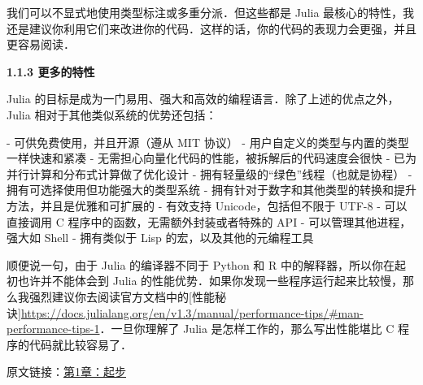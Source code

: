 我们可以不显式地使用类型标注或多重分派．但这些都是 Julia 最核心的特性，我还是建议你利用它们来改进你的代码．这样的话，你的代码的表现力会更强，并且更容易阅读．

\textbf{1.1.3 更多的特性}

Julia 的目标是成为一门易用、强大和高效的编程语言．除了上述的优点之外，Julia 相对于其他类似系统的优势还包括：

- 可供免费使用，并且开源（遵从 MIT 协议）
- 用户自定义的类型与内置的类型一样快速和紧凑
- 无需担心向量化代码的性能，被拆解后的代码速度会很快
- 已为并行计算和分布式计算做了优化设计
- 拥有轻量级的“绿色”线程（也就是协程）
- 拥有可选择使用但功能强大的类型系统
- 拥有针对于数字和其他类型的转换和提升方法，并且是优雅和可扩展的
- 有效支持 Unicode，包括但不限于 UTF-8
- 可以直接调用 C 程序中的函数，无需额外封装或者特殊的 API
- 可以管理其他进程，强大如 Shell
- 拥有类似于 Lisp 的宏，以及其他的元编程工具

顺便说一句，由于 Julia 的编译器不同于 Python 和 R 中的解释器，所以你在起初也许并不能体会到 Julia 的性能优势．如果你发现一些程序运行起来比较慢，那么我强烈建议你去阅读官方文档中的[性能秘诀]\href{https://docs.julialang.org/en/v1.3/manual/performance-tips/#man-performance-tips-1}{https://docs.julialang.org/en/v1.3/manual/performance-tips/#man-performance-tips-1}．一旦你理解了 Julia 是怎样工作的，那么写出性能堪比 C 程序的代码就比较容易了．


原文链接：\href{https://github.com/hyper0x/JuliaBasics/blob/master/book/ch01.md}{第1章：起步}